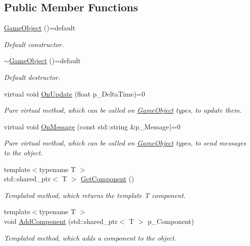 \subsection*{Public Member Functions}
\begin{DoxyCompactItemize}
\item 
\mbox{\label{class_game_object_a49f0fc91c3048ec583044e7a1b9c2518}} 
\mbox{\hyperlink{class_game_object_a49f0fc91c3048ec583044e7a1b9c2518}{Game\+Object}} ()=default
\begin{DoxyCompactList}\small\item\em Default constructor. \end{DoxyCompactList}\item 
\mbox{\label{class_game_object_aac8336499118faec34e0f406c022a25a}} 
\mbox{\hyperlink{class_game_object_aac8336499118faec34e0f406c022a25a}{$\sim$\+Game\+Object}} ()=default
\begin{DoxyCompactList}\small\item\em Default destructor. \end{DoxyCompactList}\item 
virtual void \mbox{\hyperlink{class_game_object_a3d4444ab3efd5e3041014da90a66c081}{On\+Update}} (float p\+\_\+\+Delta\+Time)=0
\begin{DoxyCompactList}\small\item\em Pure virtual method, which can be called on \mbox{\hyperlink{class_game_object}{Game\+Object}} types, to update them. \end{DoxyCompactList}\item 
virtual void \mbox{\hyperlink{class_game_object_a162f15f809f5181e3264b9f4d768bea2}{On\+Message}} (const std\+::string \&p\+\_\+\+Message)=0
\begin{DoxyCompactList}\small\item\em Pure virtual method, which can be called on \mbox{\hyperlink{class_game_object}{Game\+Object}} types, to send messages to the object. \end{DoxyCompactList}\item 
{\footnotesize template$<$typename T $>$ }\\std\+::shared\+\_\+ptr$<$ T $>$ \mbox{\hyperlink{class_game_object_aae4f7351aa098e152f1f74988e458085}{Get\+Component}} ()
\begin{DoxyCompactList}\small\item\em Templated method, which returns the template T component. \end{DoxyCompactList}\item 
{\footnotesize template$<$typename T $>$ }\\void \mbox{\hyperlink{class_game_object_a3eee38860ec832fdc2b34f158c4a316f}{Add\+Component}} (std\+::shared\+\_\+ptr$<$ T $>$ p\+\_\+\+Component)
\begin{DoxyCompactList}\small\item\em Templated method, which adds a component to the object. \end{DoxyCompactList}\end{DoxyCompactItemize}

